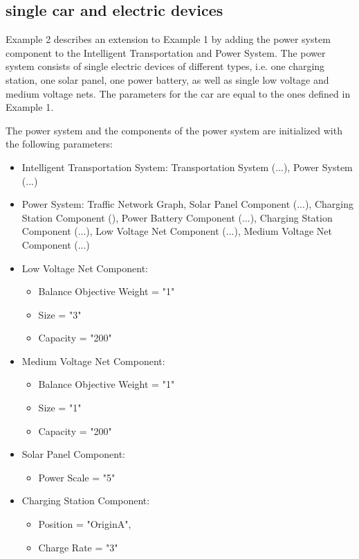 \subsection{single car and electric devices}
Example 2 describes an extension to Example 1 by adding the power system component to the Intelligent Transportation and Power System. The power system consists of single electric devices of different types, i.e. one charging station, one solar panel, one power battery, as well as single low voltage and medium voltage nets. The parameters for the car are equal to the ones defined in Example 1.

The power system and the components of the power system are initialized with the following parameters:

\begin{itemize}
	\item Intelligent Transportation System: Transportation System (...), Power System (...)
	\item Power System: Traffic Network Graph, Solar Panel Component (...), Charging Station Component (), Power Battery Component (...), Charging Station Component (...), Low Voltage Net Component (...), Medium Voltage Net Component (...)
	
	\item Low Voltage Net Component:
	\begin{itemize}  
		\item Balance Objective Weight = "1"
		\item Size = "3"
		\item Capacity = "200"
	\end{itemize}
	
	\item Medium Voltage Net Component:
	\begin{itemize}  
		\item Balance Objective Weight = "1"
		\item Size = "1"
		\item Capacity = "200"
	\end{itemize}
	
	\item Solar Panel Component:
	\begin{itemize}
		\item Power Scale = "5"
	\end{itemize}	
	
	\item Charging Station Component:
	\begin{itemize}
		\item Position = "OriginA", 
		\item Charge Rate = "3"
	\end{itemize}
	

\end{itemize}
